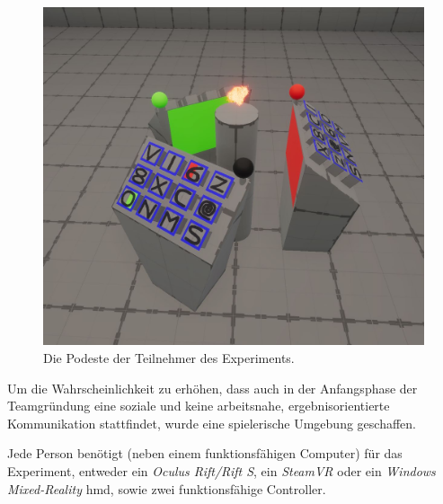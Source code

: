 \documentclass[a4paper,11pt]{article}%
\renewcommand{\\}{\vspace*{0.5\baselineskip} \newline}
\begin{document}
\begin{figure}[h]
		\begin{footnotesize}
			\includegraphics[width=\textwidth]{Abbildungen/Podeste.JPG}	
			\caption[Die Podeste der Teilnehmer]{Die Podeste der Teilnehmer des Experiments.}
			\label{Podeste}
		\end{footnotesize}
	\end{figure}

Um die Wahrscheinlichkeit zu erhöhen, dass auch in der Anfangsphase der Teamgründung eine soziale und keine arbeitsnahe, ergebnisorientierte Kommunikation stattfindet, wurde eine spielerische Umgebung geschaffen.

Jede Person benötigt (neben einem funktionsfähigen Computer) für das Experiment, entweder ein \textit{Oculus Rift/Rift S}, ein \textit{SteamVR} oder ein \textit{Windows Mixed-Reality} \ac{hmd}, sowie zwei funktionsfähige Controller.
\end{document}
